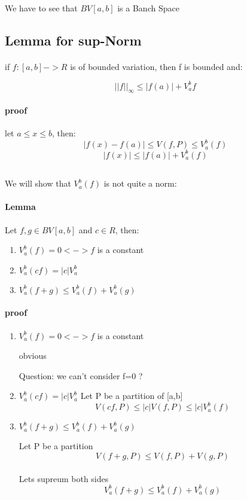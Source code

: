 \documentclass{article}
\begin{document}
\paragraph{}

We have to see that $BV[a,b]$ is a Banch Space

\subsection{Lemma for sup-Norm}
\paragraph{}
if $f:[a,b] -> R$ is of bounded variation, then f is bounded and:

$$|| f ||_{\infty} \leq |f(a)| + V^{b}_{a}f$$

\paragraph{proof}
let $a \leq x \leq b$, then:
$$|f(x)-f(a)| \leq V(f,P) \leq V_a^b(f)$$
$$|f(x)| \leq |f(a)| + V_a^b(f)$$

\subsection{}
We will show that $V_{a}^{b}(f)$ is not quite a norm:
\paragraph{Lemma}
Let $f, g \in BV[a,b]$ and $c \in R$, then:
\begin{enumerate}
  \item $V_a^{b}(f) = 0 <-> f$ is a constant
  \item $V_a^b(cf) = |c|V_{a}^b$
  \item $V_a^{b}(f+g) \leq V_{a}^b(f) + V_{a}^b(g) $
\end{enumerate}

\paragraph{proof}
\begin{enumerate}
  \item $V_a^{b}(f) = 0 <-> f$ is a constant
	
	obvious

	Question: we can't consider f=0 ?
  \item $V_a^b(cf) = |c|V_{a}^b$
	Let P be a partition of [a,b] \\
	$$V(cf, P) \leq |c|V(f,P) \leq |c|V_a^b(f)$$

  \item $V_a^{b}(f+g) \leq V_{a}^b(f) + V_{a}^b(g) $
	
	Let P be a partition \\ 
	$$V(f+g, P) \leq V(f,P) + V(g, P)$$ \\
	Lets supreum both sides \\
	$$V^{b}_a(f+g) \leq V^b_a(f) + V^b_a(g)$$
\end{enumerate}
\end{document}
